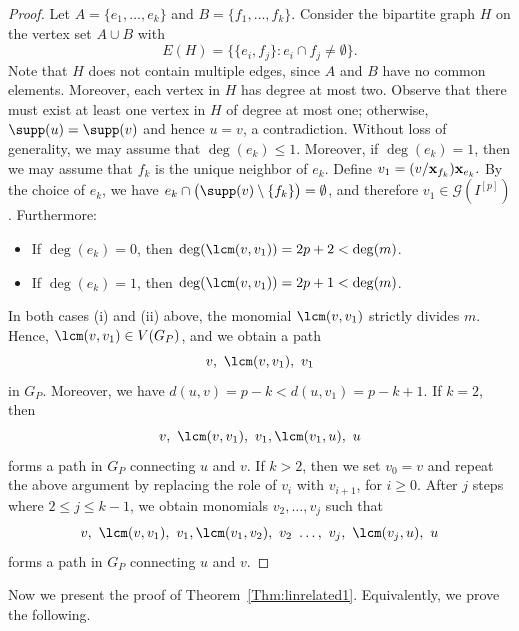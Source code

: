 \documentclass[12pt]{amsart}
\begin{document}
\begin{proof}
Let $A = \{e_1, \ldots, e_k\}$ and $B= \{f_1, \ldots, f_k\}$. 
Consider the bipartite graph $H$ on the vertex set $A \cup B$ with
\[
E(H) = \bigl\{ \{e_i, f_j\} : e_i \cap f_j \ne \emptyset \bigr\}.
\]
Note that $H$ does not contain multiple edges, since $A$ and $B$ have no common elements. 
Moreover, each vertex in $H$ has degree at most two. 
Observe that there must exist at least one vertex in $H$ of degree at most one; otherwise, $\supp(u) = \supp(v)$ and hence $u = v$, a contradiction. Without loss of generality, we may assume that $\deg(e_k) \le 1$. Moreover, if $\deg(e_k) = 1$, then we may assume that $f_k$ is the unique neighbor of $e_k$. Define $v_1 = (v / {\bf x}_{f_k}) {\bf x}_{e_k}.$ By the choice of $e_k$, we have $e_k \cap \bigl(\supp(v) \setminus \{f_k\}\bigr) = \emptyset$, and therefore $v_1 \in \mathcal{G}(I^{[p]})$. 
Furthermore:
\begin{itemize}
    \item[(i)] If $\deg(e_k) = 0$, then $\deg(\lcm(v, v_1)) = 2p + 2 < \deg(m)$.
    \item[(ii)] If $\deg(e_k) = 1$, then $\deg(\lcm(v, v_1)) = 2p + 1 < \deg(m)$.
\end{itemize}

In both cases \textup{(i)} and \textup{(ii)} above, the monomial $\lcm(v, v_1)$ strictly divides $m$. 
Hence, $\lcm(v, v_1) \in V(G_P)$, and we obtain a path 
\[
v, \ \lcm(v, v_1), \ v_1
\]
in $G_P$. 
Moreover, we have $d(u, v)=p-k < d(u, v_1)=p-k+1$. If $k=2$, then 
\[
v, \ \lcm(v, v_1), \ v_1, \lcm(v_1, u), \ u
\]
forms a path in $G_P$ connecting $u$ and $v$. If $k>2$, then we set $v_0=v$ and repeat the above argument by replacing the role of $v_i$ with $v_{i+1}$, for $i\ge 0$. After  $j$ steps where $2 \leq j\leq k-1$, we obtain monomials $v_2, \ldots, v_{j}$ such that 
\[
v, \ \lcm(v, v_1), \ v_1, \lcm(v_1, v_2), \ v_2\ \ldots, \ v_{j}, \ \lcm(v_{j}, u), \ u
\]
forms a path in $G_P$ connecting $u$ and $v$.
\end{proof}



   Now we present the proof of Theorem~\ref{Thm:linrelated1}. Equivalently, we prove the following. 
   
\end{document}
